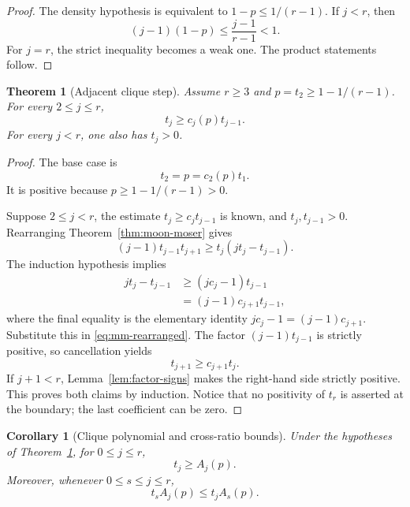 \documentclass[11pt]{article}
\newtheorem{theorem}{Theorem}
\newtheorem{corollary}{Corollary}
\begin{document}
\begin{proof}
The density hypothesis is equivalent to
\(1-p\le1/(r-1)\).  If \(j<r\), then
\[
    (j-1)(1-p)
    \le
    \frac{j-1}{r-1}<1.
\]
For \(j=r\), the strict inequality becomes a weak one.  The product
statements follow.
\end{proof}

\begin{theorem}[Adjacent clique step]\label{thm:clique-step}
Assume \(r\ge3\) and \(p=t_2\ge1-1/(r-1)\).  For every
\(2\le j\le r\),
\begin{equation}\label{eq:clique-step}
    t_j\ge c_j(p)t_{j-1}.
\end{equation}
For every \(j<r\), one also has \(t_j>0\).
\end{theorem}

\begin{proof}
The base case is
\[
    t_2=p=c_2(p)t_1.
\]
It is positive because \(p\ge1-1/(r-1)>0\).

Suppose \(2\le j<r\), the estimate
\(t_j\ge c_jt_{j-1}\) is known, and \(t_j,t_{j-1}>0\).  Rearranging
Theorem~\ref{thm:moon-moser} gives
\begin{equation}\label{eq:mm-rearranged}
    (j-1)t_{j-1}t_{j+1}
    \ge
    t_j(jt_j-t_{j-1}).
\end{equation}
The induction hypothesis implies
\[
\begin{aligned}
    jt_j-t_{j-1}
    &\ge (jc_j-1)t_{j-1}\\
    &=(j-1)c_{j+1}t_{j-1},
\end{aligned}
\]
where the final equality is the elementary identity
\(jc_j-1=(j-1)c_{j+1}\).  Substitute this in
\eqref{eq:mm-rearranged}.  The factor \((j-1)t_{j-1}\) is strictly positive,
so cancellation yields
\[
    t_{j+1}\ge c_{j+1}t_j.
\]
If \(j+1<r\), Lemma~\ref{lem:factor-signs} makes the right-hand side
strictly positive.  This proves both claims by induction.  Notice that no
positivity of \(t_r\) is asserted at the boundary; the last coefficient can
be zero.
\end{proof}

\begin{corollary}[Clique polynomial and cross-ratio bounds]
Under the hypotheses of Theorem~\ref{thm:clique-step}, for \(0\le j\le r\),
\begin{equation}\label{eq:clique-poly-lower}
    t_j\ge A_j(p).
\end{equation}
Moreover, whenever \(0\le s\le j\le r\),
\begin{equation}\label{eq:cross-ratio}
    t_sA_j(p)\le t_jA_s(p).
\end{equation}
\end{corollary}
\end{document}

